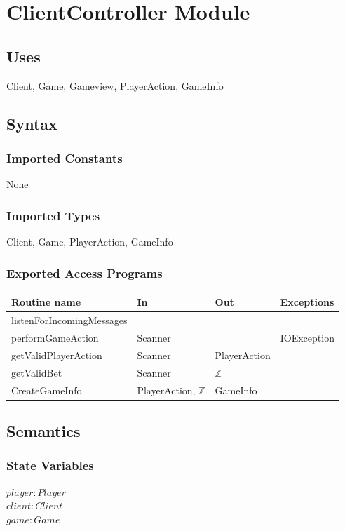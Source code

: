 \documentclass[12pt, titlepage]{article}
\begin{document}
\section* {ClientController Module}
    \subsection* {Uses}
        Client, Game, Gameview, PlayerAction, GameInfo
    \subsection* {Syntax}
    
        \subsubsection* {Imported Constants}
            None
        \subsubsection* {Imported Types}
            Client, Game, PlayerAction, GameInfo
        \subsubsection* {Exported Access Programs}
        
        \begin{tabular}{| l | l | l | p{4cm} |}
            \hline
            \textbf{Routine name} & \textbf{In} & \textbf{Out} & \textbf{Exceptions}\\
            \hline
            listenForIncomingMessages &  &  &\\
            \hline
            performGameAction & Scanner &  & IOException\\
            \hline 
            getValidPlayerAction & Scanner & PlayerAction &\\
            \hline 
            getValidBet & Scanner & $\mathbb{Z}$ &\\
            \hline 
            CreateGameInfo & PlayerAction, $\mathbb{Z}$ & GameInfo &\\
            \hline 
        \end{tabular}
        
    \subsection* {Semantics}
    
    \subsubsection* {State Variables}
        $\mathit{player}: Player$\\
        $\mathit{client}: Client$\\
        $\mathit{game} : Game$\\
    
\end{document}
